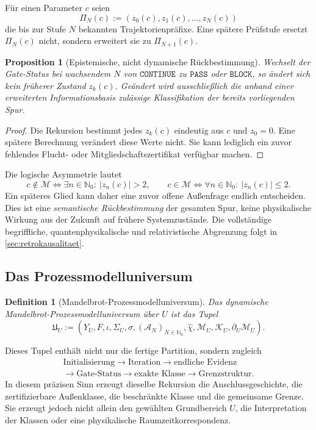 \documentclass[11pt,a4paper]{article}
\newtheorem{definition}{Definition}[section]
\newtheorem{proposition}{Proposition}[section]
\theoremstyle{remark}
\newcommand{\M}{\mathcal{M}}
\newcommand{\K}{\mathcal{K}}
\newcommand{\N}{\mathbb{N}}
\newcommand{\PASS}{\texttt{PASS}}
\newcommand{\CONTINUE}{\texttt{CONTINUE}}
\newcommand{\BLOCK}{\texttt{BLOCK}}
\begin{document}
Für einen Parameter \(c\) seien
\[
  \Pi_N(c):=(z_0(c),z_1(c),\ldots,z_N(c))
\]
die bis zur Stufe \(N\) bekannten Trajektorienpräfixe. Eine spätere Prüfstufe
ersetzt \(\Pi_N(c)\) nicht, sondern erweitert sie zu \(\Pi_{N+1}(c)\).

\begin{proposition}[Epistemische, nicht dynamische Rückbestimmung]
\label{prop:rueckbestimmung}
Wechselt der Gate-Status bei wachsendem \(N\) von \(\CONTINUE\) zu
\(\PASS\) oder \(\BLOCK\), so ändert sich kein früherer Zustand
\(z_k(c)\). Geändert wird ausschließlich die anhand einer erweiterten
Informationsbasis zulässige Klassifikation der bereits vorliegenden Spur.
\end{proposition}

\begin{proof}
Die Rekursion bestimmt jedes \(z_k(c)\) eindeutig aus \(c\) und \(z_0=0\).
Eine spätere Berechnung verändert diese Werte nicht. Sie kann lediglich ein
zuvor fehlendes Flucht- oder Mitgliedschaftszertifikat verfügbar machen.
\end{proof}

Die logische Asymmetrie lautet
\[
  c\notin\M\iff\exists n\in\N_0:\ |z_n(c)|>2,
  \qquad
  c\in\M\iff\forall n\in\N_0:\ |z_n(c)|\le2.
\]
Ein späteres Glied kann daher eine zuvor offene Außenfrage endlich
entscheiden. Dies ist eine \emph{semantische Rückbestimmung} der gesamten
Spur, keine physikalische Wirkung aus der Zukunft auf frühere Systemzustände.
Die vollständige begriffliche, quantenphysikalische und relativistische
Abgrenzung folgt in \cref{sec:retrokausalitaet}.

\subsection{Das Prozessmodelluniversum}

\begin{definition}[Mandelbrot-Prozessmodelluniversum]
Das dynamische Mandelbrot-Prozessmodelluniversum über \(U\) ist das Tupel
\[
  \mathfrak U_U:=
  \left(Y_U,F,\iota,\Sigma_U,\sigma,
  (\mathcal A_N)_{N\in\N_0},\widehat\chi,
  \M_U,\K_U,\partial_U\M_U\right).
\]
\end{definition}

Dieses Tupel enthält nicht nur die fertige Partition, sondern zugleich
\[
\begin{gathered}
\text{Initialisierung}
\longrightarrow\text{Iteration}
\longrightarrow\text{endliche Evidenz}
\\
\longrightarrow\text{Gate-Status}
\longrightarrow\text{exakte Klasse}
\longrightarrow\text{Grenzstruktur}.
\end{gathered}
\]
In diesem präzisen Sinn erzeugt dieselbe Rekursion die Anschlussgeschichte,
die zertifizierbare Außenklasse, die beschränkte Klasse und die gemeinsame
Grenze. Sie erzeugt jedoch nicht allein den gewählten Grundbereich \(U\), die
Interpretation der Klassen oder eine physikalische Raumzeitkorrespondenz.
\end{document}
